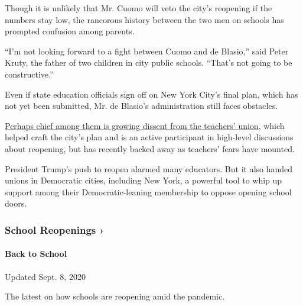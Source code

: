 Though it is unlikely that Mr. Cuomo will veto the city's reopening if
the numbers stay low, the rancorous history between the two men on
schools has prompted confusion among parents.

``I'm not looking forward to a fight between Cuomo and de Blasio,'' said
Peter Kruty, the father of two children in city public schools. ``That's
not going to be constructive.''

Even if state education officials sign off on New York City's final
plan, which has not yet been submitted, Mr. de Blasio's administration
still faces obstacles.

\href{https://www.nytimes3xbfgragh.onion/2020/07/29/us/teacher-union-school-reopening-coronavirus.html}{Perhaps
chief among them is growing dissent from the teachers' union}, which
helped craft the city's plan and is an active participant in high-level
discussions about reopening, but has recently backed away as teachers'
fears have mounted.

President Trump's push to reopen alarmed many educators. But it also
handed unions in Democratic cities, including New York, a powerful tool
to whip up support among their Democratic-leaning membership to oppose
opening school doors.

\href{https://www.nytimes3xbfgragh.onion/spotlight/schools-reopening?action=click\&pgtype=Article\&state=default\&region=MAIN_CONTENT_3\&context=storylines_keepup}{}

\hypertarget{school-reopenings-}{%
\subsubsection{School Reopenings ›}\label{school-reopenings-}}

\hypertarget{back-to-school}{%
\paragraph{Back to School}\label{back-to-school}}

Updated Sept. 8, 2020

The latest on how schools are reopening amid the pandemic.

